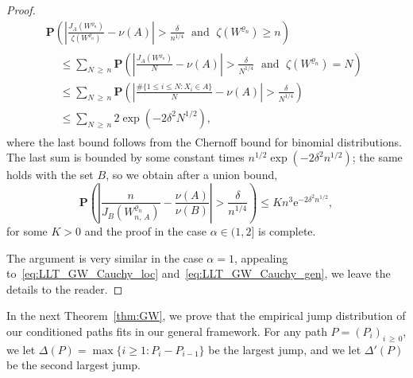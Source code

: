 \documentclass[10pt]{amsart}
\theoremstyle{definition}\newtheorem{defi}[theo]{Definition}\newtheorem{rema}[theo]{Remark}\newtheorem{exam}[theo]{Example}\newtheorem{exem}[theo]{Example}\newtheorem{nota}[theo]{Notation}
\newcommand{\ensembles}[1]{\mathbf{#1}}
\renewcommand{\P}{\ensembles{P}}
\renewcommand{\Pr}[1]{\P\left(#1\right)}
\newcommand{\1}{\ensembles{1}}
\renewcommand{\le}{\leqslant}
\renewcommand{\ge}{\geqslant}
\newcommand{\e}{\mathrm{e}}
\providecommand{\?}{}
\begin{document}
\begin{proof}
\begin{multline*}
\Pr{\left|\frac{J_A\left(W^{\varrho_n}\right)}{\zeta\left(W^{\varrho_n}\right)}- \nu(A)\right| > \frac{\delta}{n^{1/4}}\;\text{ and }\; \zeta\left(W^{\varrho_n}\right) \ge n}
\\
\begin{aligned}
&\le \sum_{N\,\ge\,n} \Pr{\left|\frac{J_A\left(W^{\varrho_n}\right)}{N}- \nu(A)\right| > \frac{\delta}{N^{1/4}}\;\text{ and }\; \zeta\left(W^{\varrho_n}\right) = N}
\\
&\le \sum_{N\,\ge\,n} \Pr{\left|\frac{\#\{1 \le i \le N : X_i \in A\}}{N}- \nu(A)\right| > \frac{\delta}{N^{1/4}}}
\\
&\le \sum_{N\,\ge\,n} 2 \exp\left(- 2 \delta^2 N^{1/2}\right),
\end{aligned}
\end{multline*}
where the last bound follows from the Chernoff bound for binomial distributions. The last sum is bounded by some constant times $n^{1/2} \exp(- 2 \delta^2 n^{1/2})$; the same holds with the set $B$, so we obtain after a union bound,
\[
\Pr{\left|\frac{n}{J_B(W^{\varrho_n}_{n,\,A})}- \frac{\nu(A)}{\nu(B)}\right| > \frac{\delta}{n^{1/4}}}
\le K n^3 \e^{- 2 \delta^2 n^{1/2}},
\]
for some $K > 0$ and the proof in the case $\alpha \in (1,2]$ is complete.

The argument is very similar in the case $\alpha=1$, appealing to~\eqref{eq:LLT_GW_Cauchy_loc} and~\eqref{eq:LLT_GW_Cauchy_gen}, we leave the details to the reader.
\end{proof}



In the next Theorem~\ref{thm:GW}, we prove that the empirical jump distribution of our conditioned paths fits in our general framework. For any path $P = (P_i)_{i\,\ge\,0}$, we let $\Delta(P) = \max\{i \ge 1 : P_i - P_{i-1}\}$ be the largest jump, and we let $\Delta'(P)$ be the second largest jump.
\end{document}
